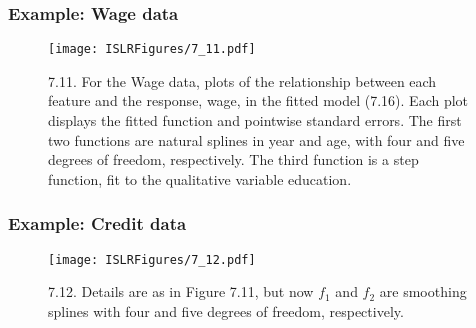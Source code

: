 \documentclass{beamer}
\begin{document}
                             \begin{frame}
                             	\frametitle{Example: Wage data}
                             	\begin{figure}
                             		\centering
                             		
                             		\centering
                             		\texttt{[image: ISLRFigures/7\_11.pdf]}
                             		\caption{7.11. For the Wage data, plots of the relationship between each feature
                             			and the response, wage, in the fitted model (7.16). Each plot displays the fitted
                             			function and pointwise standard errors. The first two functions are natural splines
                             			in year and age, with four and five degrees of freedom, respectively. The third
                             			function is a step function, fit to the qualitative variable education.
                             		}
                             	\end{figure}
                             \end{frame}
                               \begin{frame}
                               	\frametitle{Example: Credit data}
                               	\begin{figure}
                               		\centering
                               		
                               		\centering
                               		\texttt{[image: ISLRFigures/7\_12.pdf]}
                               		\caption{7.12. Details are as in Figure 7.11, but now $f_1$  and $f_2$ are smoothing
                               			splines with four and five degrees of freedom, respectively.
                               		}
                               	\end{figure}
                               \end{frame}
                               
\end{document}
